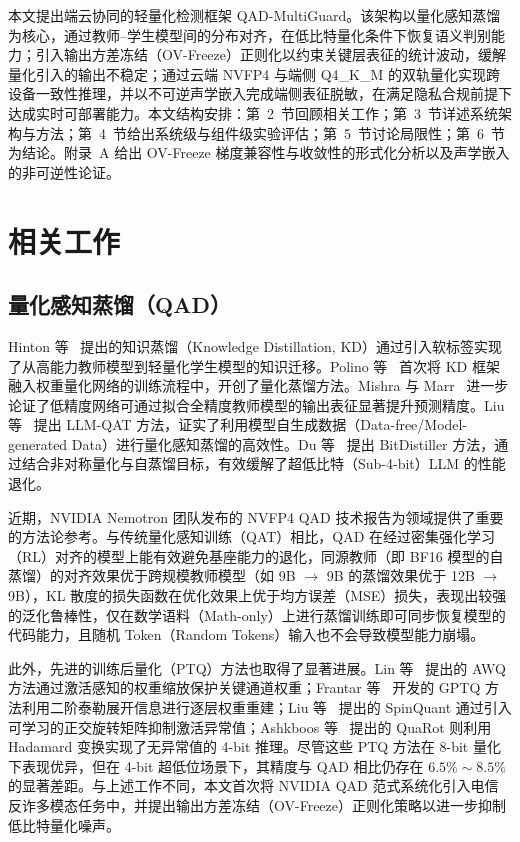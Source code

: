 \documentclass[11pt, a4paper]{article}
\begin{document}
本文提出端云协同的轻量化检测框架 QAD-MultiGuard。该架构以量化感知蒸馏为核心，通过教师--学生模型间的分布对齐，在低比特量化条件下恢复语义判别能力；引入输出方差冻结（OV-Freeze）正则化以约束关键层表征的统计波动，缓解量化引入的输出不稳定；通过云端 NVFP4 与端侧 Q4\_K\_M 的双轨量化实现跨设备一致性推理，并以不可逆声学嵌入完成端侧表征脱敏，在满足隐私合规前提下达成实时可部署能力。本文结构安排：第~2~节回顾相关工作；第~3~节详述系统架构与方法；第~4~节给出系统级与组件级实验评估；第~5~节讨论局限性；第~6~节为结论。附录~A 给出 OV-Freeze 梯度兼容性与收敛性的形式化分析以及声学嵌入的非可逆性论证。

\section{相关工作}

\subsection{量化感知蒸馏（QAD）}
Hinton 等~\cite{4} 提出的知识蒸馏（Knowledge Distillation, KD）通过引入软标签实现了从高能力教师模型到轻量化学生模型的知识迁移。Polino 等~\cite{5} 首次将 KD 框架融入权重量化网络的训练流程中，开创了量化蒸馏方法。Mishra 与 Marr~\cite{6} 进一步论证了低精度网络可通过拟合全精度教师模型的输出表征显著提升预测精度。Liu 等~\cite{7} 提出 LLM-QAT 方法，证实了利用模型自生成数据（Data-free/Model-generated Data）进行量化感知蒸馏的高效性。Du 等~\cite{8} 提出 BitDistiller 方法，通过结合非对称量化与自蒸馏目标，有效缓解了超低比特（Sub-4-bit）LLM 的性能退化。

近期，NVIDIA Nemotron 团队发布的 NVFP4 QAD 技术报告为领域提供了重要的方法论参考。与传统量化感知训练（QAT）相比，QAD 在经过密集强化学习（RL）对齐的模型上能有效避免基座能力的退化，同源教师（即 BF16 模型的自蒸馏）的对齐效果优于跨规模教师模型（如 9B $\rightarrow$ 9B 的蒸馏效果优于 12B $\rightarrow$ 9B），KL 散度的损失函数在优化效果上优于均方误差（MSE）损失，表现出较强的泛化鲁棒性，仅在数学语料（Math-only）上进行蒸馏训练即可同步恢复模型的代码能力，且随机 Token（Random Tokens）输入也不会导致模型能力崩塌。

此外，先进的训练后量化（PTQ）方法也取得了显著进展。Lin 等~\cite{9} 提出的 AWQ 方法通过激活感知的权重缩放保护关键通道权重；Frantar 等~\cite{10} 开发的 GPTQ 方法利用二阶泰勒展开信息进行逐层权重重建；Liu 等~\cite{11} 提出的 SpinQuant 通过引入可学习的正交旋转矩阵抑制激活异常值；Ashkboos 等~\cite{12} 提出的 QuaRot 则利用 Hadamard 变换实现了无异常值的 4-bit 推理。尽管这些 PTQ 方法在 8-bit 量化下表现优异，但在 4-bit 超低位场景下，其精度与 QAD 相比仍存在 $6.5\%\sim8.5\%$ 的显著差距。与上述工作不同，本文首次将 NVIDIA QAD 范式系统化引入电信反诈多模态任务中，并提出输出方差冻结（OV-Freeze）正则化策略以进一步抑制低比特量化噪声。
\end{document}
